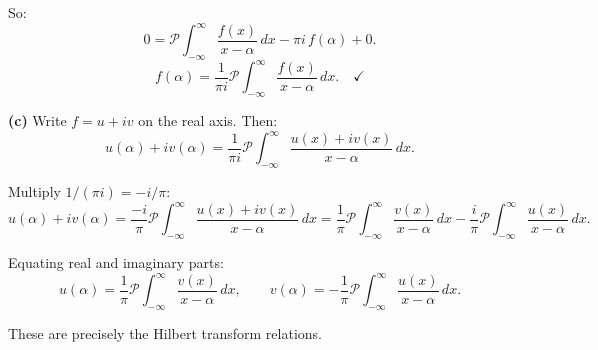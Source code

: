 \documentclass[12pt]{article}
\begin{document}
So:
\[
0 = \mathcal{P}\!\!\int_{-\infty}^{\infty}\frac{f(x)}{x-\alpha}\,dx - \pi i\,f(\alpha) + 0.
\]
\[
f(\alpha) = \frac{1}{\pi i}\mathcal{P}\!\!\int_{-\infty}^{\infty}\frac{f(x)}{x-\alpha}\,dx. \quad \checkmark
\]

\textbf{(c)} Write $f = u + iv$ on the real axis. Then:
\[
u(\alpha) + iv(\alpha) = \frac{1}{\pi i}\mathcal{P}\!\!\int_{-\infty}^{\infty}\frac{u(x)+iv(x)}{x-\alpha}\,dx.
\]

Multiply $1/(\pi i) = -i/\pi$:
\[
u(\alpha) + iv(\alpha) = \frac{-i}{\pi}\mathcal{P}\!\!\int_{-\infty}^{\infty}\frac{u(x)+iv(x)}{x-\alpha}\,dx = \frac{1}{\pi}\mathcal{P}\!\!\int_{-\infty}^{\infty}\frac{v(x)}{x-\alpha}\,dx - \frac{i}{\pi}\mathcal{P}\!\!\int_{-\infty}^{\infty}\frac{u(x)}{x-\alpha}\,dx.
\]

Equating real and imaginary parts:
\[
\boxed{u(\alpha) = \frac{1}{\pi}\mathcal{P}\!\!\int_{-\infty}^{\infty}\frac{v(x)}{x-\alpha}\,dx, \qquad v(\alpha) = -\frac{1}{\pi}\mathcal{P}\!\!\int_{-\infty}^{\infty}\frac{u(x)}{x-\alpha}\,dx.}
\]

These are precisely the Hilbert transform relations.
\end{document}
